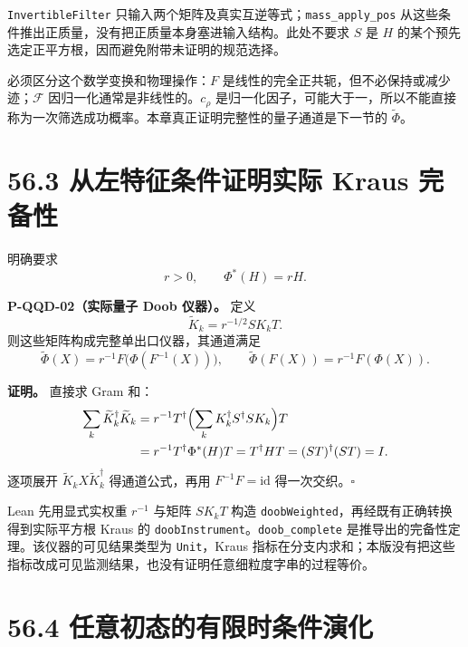 \documentclass[
  11pt,
  oneside]{book}
\begin{document}
\texttt{InvertibleFilter}
只输入两个矩阵及真实互逆等式；\texttt{mass\_\allowbreak apply\_\allowbreak pos}
从这些条件推出正质量，没有把正质量本身塞进输入结构。此处不要求 \(S\) 是
\(H\) 的某个预先选定正平方根，因而避免附带未证明的规范选择。

必须区分这个数学变换和物理操作：\(F\)
是线性的完全正共轭，但不必保持或减少迹；\(\mathcal F\)
因归一化通常是非线性的。\(c_\rho\)
是归一化因子，可能大于一，所以不能直接称为一次筛选成功概率。本章真正证明完整性的量子通道是下一节的
\(\widetilde\Phi\)。

\hypertarget{ux4eceux5de6ux7279ux5f81ux6761ux4ef6ux8bc1ux660eux5b9eux9645-kraus-ux5b8cux5907ux6027}{%
\section{56.3 从左特征条件证明实际 Kraus
完备性}\label{ux4eceux5de6ux7279ux5f81ux6761ux4ef6ux8bc1ux660eux5b9eux9645-kraus-ux5b8cux5907ux6027}}

明确要求 \[
r>0,\qquad \Phi^*(H)=rH.
\]

\protect\hypertarget{p-qqd-02}{}{}

\textbf{P-QQD-02（实际量子 Doob 仪器）。} 定义 \[
\widetilde K_k=r^{-1/2}SK_kT.
\] 则这些矩阵构成完整单出口仪器，其通道满足 \[
\widetilde\Phi(X)=r^{-1}F\bigl(\Phi(F^{-1}(X))\bigr),
\qquad \widetilde\Phi(F(X))=r^{-1}F(\Phi(X)).
\]

\textbf{证明。} 直接求 Gram 和： \[
\begin{aligned}
\sum_k\widetilde K_k^\dagger\widetilde K_k
&=r^{-1}T^\dagger\Bigl(\sum_kK_k^\dagger S^\dagger SK_k\Bigr)T\\
&=r^{-1}T^\dagger\Phi^*(H)T
=T^\dagger HT=(ST)^\dagger(ST)=I.
\end{aligned}
\] 逐项展开 \(\widetilde K_kX\widetilde K_k^\dagger\) 得通道公式，再用
\(F^{-1}F=\mathrm{id}\) 得一次交织。\(\square\)

Lean 先用显式实权重 \(r^{-1}\) 与矩阵 \(SK_kT\) 构造
\texttt{doobWeighted}，再经既有正确转换得到实际平方根 Kraus 的
\texttt{doobInstrument}。\texttt{doob\_\allowbreak complete}
是推导出的完备性定理。该仪器的可见结果类型为 \texttt{Unit}，Kraus
指标在分支内求和；本版没有把这些指标改成可见监测结果，也没有证明任意细粒度字串的过程等价。

\hypertarget{ux4efbux610fux521dux6001ux7684ux6709ux9650ux65f6ux6761ux4ef6ux6f14ux5316}{%
\section{56.4
任意初态的有限时条件演化}\label{ux4efbux610fux521dux6001ux7684ux6709ux9650ux65f6ux6761ux4ef6ux6f14ux5316}}
\end{document}
